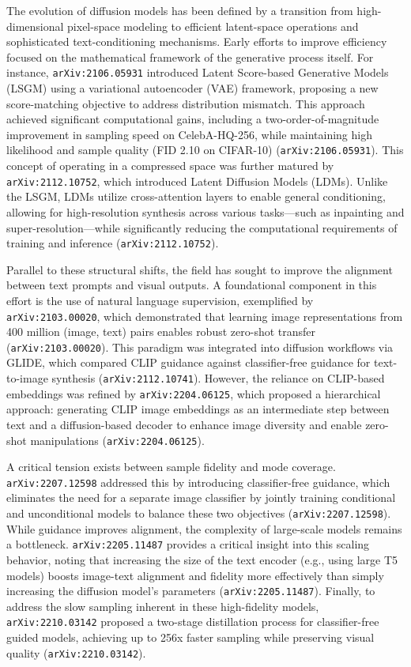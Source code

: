 \documentclass[11pt]{article}
\begin{document}
The evolution of diffusion models has been defined by a transition from high-dimensional pixel-space modeling to efficient latent-space operations and sophisticated text-conditioning mechanisms. Early efforts to improve efficiency focused on the mathematical framework of the generative process itself. For instance, \texttt{arXiv:2106.05931} introduced Latent Score-based Generative Models (LSGM) using a variational autoencoder (VAE) framework, proposing a new score-matching objective to address distribution mismatch. This approach achieved significant computational gains, including a two-order-of-magnitude improvement in sampling speed on CelebA-HQ-256, while maintaining high likelihood and sample quality (FID 2.10 on CIFAR-10) (\texttt{arXiv:2106.05931}). This concept of operating in a compressed space was further matured by \texttt{arXiv:2112.10752}, which introduced Latent Diffusion Models (LDMs). Unlike the LSGM, LDMs utilize cross-attention layers to enable general conditioning, allowing for high-resolution synthesis across various tasks—such as inpainting and super-resolution—while significantly reducing the computational requirements of training and inference (\texttt{arXiv:2112.10752}).

Parallel to these structural shifts, the field has sought to improve the alignment between text prompts and visual outputs. A foundational component in this effort is the use of natural language supervision, exemplified by \texttt{arXiv:2103.00020}, which demonstrated that learning image representations from 400 million (image, text) pairs enables robust zero-shot transfer (\texttt{arXiv:2103.00020}). This paradigm was integrated into diffusion workflows via GLIDE, which compared CLIP guidance against classifier-free guidance for text-to-image synthesis (\texttt{arXiv:2112.10741}). However, the reliance on CLIP-based embeddings was refined by \texttt{arXiv:2204.06125}, which proposed a hierarchical approach: generating CLIP image embeddings as an intermediate step between text and a diffusion-based decoder to enhance image diversity and enable zero-shot manipulations (\texttt{arXiv:2204.06125}).

A critical tension exists between sample fidelity and mode coverage. \texttt{arXiv:2207.12598} addressed this by introducing classifier-free guidance, which eliminates the need for a separate image classifier by jointly training conditional and unconditional models to balance these two objectives (\texttt{arXiv:2207.12598}). While guidance improves alignment, the complexity of large-scale models remains a bottleneck. \texttt{arXiv:2205.11487} provides a critical insight into this scaling behavior, noting that increasing the size of the text encoder (e.g., using large T5 models) boosts image-text alignment and fidelity more effectively than simply increasing the diffusion model's parameters (\texttt{arXiv:2205.11487}). Finally, to address the slow sampling inherent in these high-fidelity models, \texttt{arXiv:2210.03142} proposed a two-stage distillation process for classifier-free guided models, achieving up to 256x faster sampling while preserving visual quality (\texttt{arXiv:2210.03142}).
\end{document}
